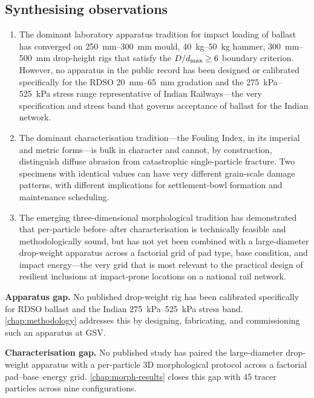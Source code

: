 \subsection{Synthesising observations}
\label{sec:lit-synth-obs}

\begin{enumerate}[label=(\arabic*),leftmargin=*]
    \item The dominant laboratory apparatus tradition for impact loading of
          ballast has converged on \SIrange{250}{300}{\milli\metre} mould,
          \SIrange{40}{50}{\kilogram} hammer, \SIrange{300}{500}{\milli\metre}
          drop-height rigs that satisfy the $D/d_{\max} \ge 6$ boundary
          criterion. However, no apparatus in the public record has been
          designed or calibrated specifically for the \gls{RDSO}
          \SIrange{20}{65}{\milli\metre} gradation and the
          \SIrange{275}{525}{\kilo\pascal} stress range representative of
          Indian Railways---the very specification and stress band that
          governs acceptance of ballast for the Indian network.
    \item The dominant characterisation tradition---the Fouling Index, in
          its imperial and metric forms---is bulk in character and
          cannot, by construction, distinguish diffuse abrasion from
          catastrophic single-particle fracture. Two specimens with
          identical \FIIN{} values can have very different grain-scale
          damage patterns, with different implications for
          settlement-bowl formation and maintenance scheduling.
    \item The emerging three-dimensional morphological tradition has
          demonstrated that per-particle before--after characterisation
          is technically feasible and methodologically sound, but has not
          yet been combined with a large-diameter drop-weight apparatus
          across a factorial grid of pad type, base condition, and impact
          energy---the very grid that is most relevant to the practical
          design of resilient inclusions at impact-prone locations on a
          national rail network.
\end{enumerate}

\begin{finding}[title=The two gaps closed by this thesis]
\textbf{Apparatus gap.} No published drop-weight rig has been
calibrated specifically for \gls{RDSO} ballast and the Indian
\SIrange{275}{525}{\kilo\pascal} stress band. \cref{chap:methodology}
addresses this by designing, fabricating, and commissioning such an
apparatus at \gls{GSV}.\par\smallskip
\textbf{Characterisation gap.} No published study has paired the
large-diameter drop-weight apparatus with a per-particle 3D
morphological protocol across a factorial pad--base--energy grid.
\cref{chap:morph-results} closes this gap with 45 tracer particles
across nine configurations.
\end{finding}

